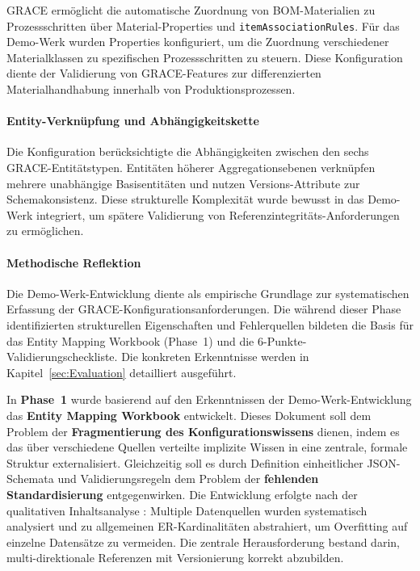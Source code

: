GRACE ermöglicht die automatische Zuordnung von BOM-Materialien zu Prozessschritten über Material-Properties und \texttt{itemAssociationRules}. Für das Demo-Werk wurden Properties konfiguriert, um die Zuordnung verschiedener Materialklassen zu spezifischen Prozessschritten zu steuern. Diese Konfiguration diente der Validierung von GRACE-Features zur differenzierten Materialhandhabung innerhalb von Produktionsprozessen.

\paragraph{Entity-Verknüpfung und Abhängigkeitskette}

Die Konfiguration berücksichtigte die Abhängigkeiten zwischen den sechs GRACE-Entitätstypen. Entitäten höherer Aggregationsebenen verknüpfen mehrere unabhängige Basisentitäten und nutzen Versions-Attribute zur Schemakonsistenz. Diese strukturelle Komplexität wurde bewusst in das Demo-Werk integriert, um spätere Validierung von Referenzintegritäts-Anforderungen zu ermöglichen.

\paragraph{Methodische Reflektion}

Die Demo-Werk-Entwicklung diente als empirische Grundlage zur systematischen Erfassung der GRACE-Konfigurationsanforderungen. Die während dieser Phase identifizierten strukturellen Eigenschaften und Fehlerquellen bildeten die Basis für das Entity Mapping Workbook (Phase~1) und die 6-Punkte-Validierungscheckliste. Die konkreten Erkenntnisse werden in Kapitel~\ref{sec:Evaluation} detailliert ausgeführt.


In \textbf{Phase~1} wurde basierend auf den Erkenntnissen der Demo-Werk-Entwicklung das \textbf{Entity Mapping Workbook} entwickelt. Dieses Dokument soll dem Problem der \textbf{Fragmentierung des Konfigurationswissens} dienen, indem es das über verschiedene Quellen verteilte implizite Wissen in eine zentrale, formale Struktur externalisiert. Gleichzeitig soll es durch Definition einheitlicher JSON-Schemata und Validierungsregeln dem Problem der \textbf{fehlenden Standardisierung} entgegenwirken. Die Entwicklung erfolgte nach der qualitativen Inhaltsanalyse \citep{mayring:qualitative2015}: Multiple Datenquellen wurden systematisch analysiert und zu allgemeinen ER-Kardinalitäten abstrahiert, um Overfitting auf einzelne Datensätze zu vermeiden. Die zentrale Herausforderung bestand darin, multi-direktionale Referenzen mit Versionierung korrekt abzubilden.

